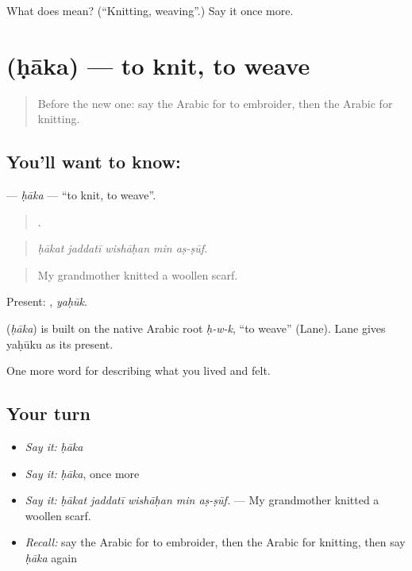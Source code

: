 \begin{tcolorbox}[breakable,colback=teal!4,colframe=teal!35!black,title={Before you move on}]
What does  mean? (\textquotedblleft{}Knitting, weaving\textquotedblright{}.) Say it once more.
\end{tcolorbox}
\section[\texorpdfstring{\ar{حاك} (ḥāka)}{حاك (ḥāka)}]{ (ḥāka) — to knit, to weave}

\label{lesson:AR-C538-haka-knit}



\begin{quote}
Before the new one: say the Arabic for to embroider, then the Arabic for knitting.
\end{quote}

\subsection*{You'll want to know: }
\textbf{} — \emph{ḥāka} — \textquotedblleft{}to knit, to weave\textquotedblright{}.

\begin{quote}
    .
\end{quote}

\begin{quote}
\emph{ḥākat jaddatī wishāḥan min aṣ-ṣūf.}
\end{quote}

\begin{quote}
My grandmother knitted a woollen scarf.
\end{quote}

Present: , \emph{yaḥūk}.

\begin{cousinweb}
\textbf{} (\emph{ḥāka}) is built on the native Arabic root \emph{ḥ-w-k}, \textquotedblleft{}to weave\textquotedblright{} (Lane). Lane gives yaḥūku as its present.
\end{cousinweb}

\begin{grammarlens}[title={What you've built}]
One more word for describing what you lived and felt.
\end{grammarlens}

\subsection*{Your turn}
\begin{itemize}
\raggedright
  \item \emph{Say it:} \emph{ḥāka}
  \item \emph{Say it:} \emph{ḥāka}, once more
  \item \emph{Say it:} \emph{ḥākat jaddatī wishāḥan min aṣ-ṣūf.} — My grandmother knitted a woollen scarf.
  \item \emph{Recall:} say the Arabic for to embroider, then the Arabic for knitting, then say \emph{ḥāka} again
\end{itemize}

